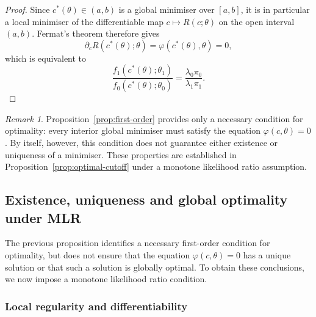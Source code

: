 \documentclass[11pt,a4paper]{article}
\theoremstyle{definition}
\theoremstyle{remark}
\newtheorem{remark}[theorem]{Remark}
\newcommand{\1}{\mathbf{1}}
\begin{document}
\begin{proof}
Since $c^*(\theta)\in(a,b)$ is a global minimiser over $[a,b]$,
it is in particular a local minimiser of the differentiable map
$c\mapsto R(c;\theta)$ on the open interval $(a,b)$. Fermat's
theorem therefore gives
\[
\partial_c R(c^*(\theta);\theta)=\varphi(c^*(\theta),\theta)=0,
\]
which is equivalent to
\[
\frac{f_1(c^*(\theta);\theta_1)}{f_0(c^*(\theta);\theta_0)}
=
\frac{\lambda_0\pi_0}{\lambda_1\pi_1}.
\]
\end{proof}

\begin{remark}
\normalfont
Proposition~\ref{prop:first-order} provides only a necessary
condition for optimality: every interior global minimiser must
satisfy the equation $\varphi(c,\theta)=0$. By itself, however,
this condition does not guarantee either existence or uniqueness
of a minimiser. These properties are established in
Proposition~\ref{prop:optimal-cutoff} under a monotone
likelihood ratio assumption.
\end{remark}

\subsection{Existence, uniqueness and global optimality under MLR}

The previous proposition identifies a necessary first-order
condition for optimality, but does not ensure that the equation
$\varphi(c,\theta)=0$ has a unique solution or that such a
solution is globally optimal. To obtain these conclusions, we now impose a monotone likelihood ratio condition.

\subsubsection*{Local regularity and differentiability}
\end{document}
